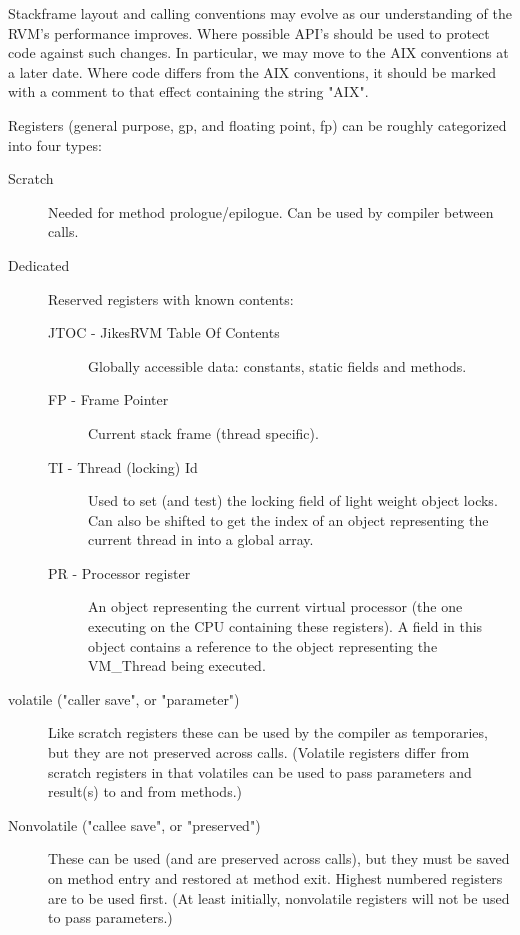 Stackframe layout and calling conventions may evolve as our understanding
of the RVM's performance improves.  Where possible API's should be used
to protect code against such changes.  In particular, we may move to
the AIX conventions at a later date.  Where code differs from the AIX
conventions, it should be marked with a comment to that effect containing
the string "AIX".


Registers (general purpose, gp, and floating point, fp) can be roughly
categorized into four types:

\begin{description}
\item [Scratch]
     Needed for method prologue/epilogue.  Can be used by compiler between
     calls.

\item[Dedicated]
     Reserved registers with known contents:
\begin{description}
\item [JTOC - JikesRVM Table Of Contents]
        Globally accessible data: constants, static fields and methods.

\item [FP - Frame Pointer]
        Current stack frame (thread specific).

\item [TI - Thread (locking) Id]
        Used to set (and test) the locking field of light weight object
        locks.  Can also be shifted to get the index of an object
        representing the current thread in into a global array.

\item [PR - Processor register]
        An object representing the current virtual processor (the one
        executing on the CPU containing these registers).  A field in
        this object contains a reference to the object representing
        the VM\_Thread being executed.
\end{description}

\item [volatile ("caller save", or "parameter")]
     Like scratch registers these can be used by the compiler as
     temporaries, but they are not preserved across calls.  (Volatile
     registers differ from scratch registers in that volatiles
     can be used to pass parameters and result(s) to and from
     methods.)

\item [Nonvolatile ("callee save", or "preserved")]
     These can be used (and are preserved across calls), but they must be
     saved on method entry and restored at method exit.  Highest numbered
     registers are to be used first.  (At least initially, nonvolatile
     registers will not be used to pass parameters.)


\end{description}
